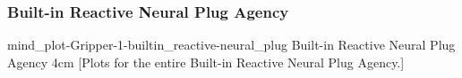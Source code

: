 {\newpage
  \noindent\begin{minipage}{\textwidth}
    \subsubsection{Built-in Reactive Neural Plug Agency}
    \experimentcausegroupplots{\dataappendixmaxtime}
                           {\dataappendixexperimentonemaxtime}
                           {\dataappendixexperimenttwomaxtime}
                           {\dataappendixexperimentthreemaxtime}
                           {\dataappendixexperimentonename}
                           {\dataappendixexperimenttwoname}
                           {\dataappendixexperimentthreename}
                           {\dataappendixexperimentoneprettyname}
                           {\dataappendixexperimenttwoprettyname}
                           \experimentcausegroupplotscontinued{\dataappendixexperimentthreeprettyname}
                                                              {mind_plot-Gripper-1-builtin_reactive-neural_plug}
                                                              {Built-in Reactive Neural Plug Agency}
                                                              {\experimentdatacommontablereference}
                                                              {4cm}
    \experimentdatablocksworldexample
    [Plots for the entire
      Built-in Reactive Neural Plug Agency.]{}
  \label{figure:mind_plot-Gripper-1-builtin_reactive-neural_plug}
  \end{minipage}
}
